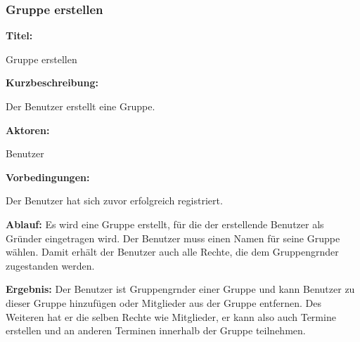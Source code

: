 \documentclass{scrartcl}
\begin{document}
	\subsubsection{Gruppe erstellen}
	\begin{description}
		\item \textbf{Titel:}
		\begin{description}
			\item Gruppe erstellen
		\end{description}
		\item \textbf{Kurzbeschreibung:}
		\begin{description}
			\item Der Benutzer erstellt eine Gruppe.
		\end{description}
		\item \textbf{Aktoren:}
		\begin{description}
			\item Benutzer 
		\end{description}
		\item \textbf{Vorbedingungen:}
		\begin{description}
			\item Der Benutzer hat sich zuvor erfolgreich registriert.
		\end{description}
		\item \textbf{Ablauf:} \newline Es wird eine Gruppe erstellt, für die der erstellende Benutzer als Gründer eingetragen wird. Der Benutzer muss einen Namen für seine Gruppe wählen. Damit erhält der Benutzer auch alle Rechte, die dem \gls{Gruppengrnder} zugestanden werden. 
		\item \textbf{Ergebnis:} \newline Der Benutzer ist \gls{Gruppengrnder} einer Gruppe und kann Benutzer zu dieser Gruppe hinzufügen oder Mitglieder aus der Gruppe entfernen. Des Weiteren hat er die selben Rechte wie Mitglieder, er kann also auch Termine erstellen und an anderen Terminen innerhalb der Gruppe teilnehmen.
	\end{description}
	
	\newpage
	
\end{document}
